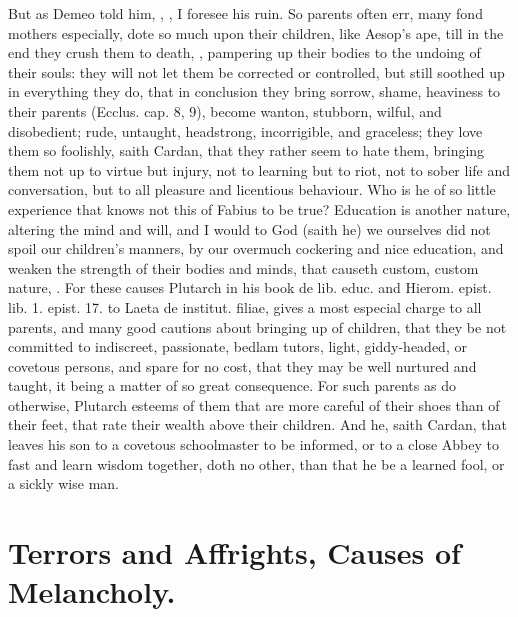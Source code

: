 {{But as Demeo told him, ,
, I foresee his ruin. So parents often err, many fond
mothers especially, dote so much upon their children, like
Aesop's ape, till in the end they crush them to death, , pampering up their bodies to the undoing of
their souls: they will not let them be corrected or controlled,
but still soothed up in everything they do, that in conclusion they
bring sorrow, shame, heaviness to their parents (Ecclus. cap.  8,
9), become wanton, stubborn, wilful, and disobedient; rude, untaught,
headstrong, incorrigible, and graceless; they love them so foolishly,
saith Cardan, that they rather seem to hate them, bringing them
not up to virtue but injury, not to learning but to riot, not to sober
life and conversation, but to all pleasure and licentious behaviour.
Who is he of so little experience that knows not this of Fabius to be
true? Education is another nature, altering the mind and will,
and I would to God (saith he) we ourselves did not spoil our children's
manners, by our overmuch cockering and nice education, and weaken the
strength of their bodies and minds, that causeth custom, custom nature,
\etc{}. For these causes Plutarch in his book de lib. educ. and Hierom.
epist. lib. 1. epist. 17. to Laeta de institut. filiae, gives a most
especial charge to all parents, and many good cautions about bringing
up of children, that they be not committed to indiscreet, passionate,
bedlam tutors, light, giddy-headed, or covetous persons, and spare for
no cost, that they may be well nurtured and taught, it being a matter
of so great consequence. For such parents as do otherwise, Plutarch
esteems of them that are more careful of their shoes than of
their feet, that rate their wealth above their children. And he, saith
Cardan, that leaves his son to a covetous schoolmaster to be
informed, or to a close Abbey to fast and learn wisdom together, doth
no other, than that he be a learned fool, or a sickly wise man.

\section{Terrors and Affrights, Causes of Melancholy.}\label{sec:terrors-and-affrights}

}}

